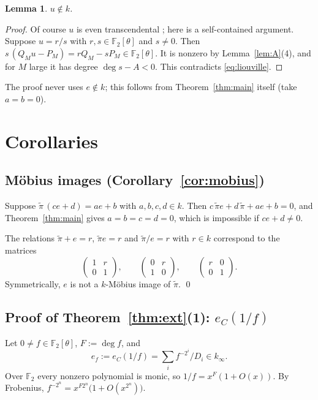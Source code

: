 \documentclass[11pt]{amsart}
\newtheorem{lemma}[theorem]{Lemma}
\theoremstyle{remark}
\numberwithin{equation}{section}
\newcommand{\F}{\mathbb{F}}
\newcommand{\kinf}{k_\infty}
\newcommand{\pit}{\tilde\pi}
\newcommand{\eC}{e_C}
\begin{document}
\begin{lemma}\label{lem:uirr}
$u\notin k$.
\end{lemma}

\begin{proof}
Of course $u$ is even transcendental \cite{Wad41}; here is a self-contained argument. Suppose $u=r/s$ with $r,s\in\F_2[\theta]$ and $s\ne0$. Then $s\,(Q_Mu-P_M)=rQ_M-sP_M\in\F_2[\theta]$. It is nonzero by Lemma~\ref{lem:A}(4), and for $M$ large it has degree $\deg s-A<0$. This contradicts \eqref{eq:liouville}.
\end{proof}

The proof never uses $e\notin k$; this follows from Theorem~\ref{thm:main} itself (take $a=b=0$).

\section{Corollaries}\label{sec:cor}

\subsection{M\"obius images (\texorpdfstring{Corollary~\ref{cor:mobius}}{Corollary 1.2})}
Suppose $\pit\,(ce+d)=ae+b$ with $a,b,c,d\in k$. Then $c\,\pit e+d\,\pit+ae+b=0$, and Theorem~\ref{thm:main} gives $a=b=c=d=0$, which is impossible if $ce+d\ne0$.

The relations $\pit+e=r$, $\pit e=r$ and $\pit/e=r$ with $r\in k$ correspond to the matrices
\[
\begin{pmatrix}1&r\\0&1\end{pmatrix},\qquad\begin{pmatrix}0&r\\1&0\end{pmatrix},\qquad\begin{pmatrix}r&0\\0&1\end{pmatrix}.
\]
Symmetrically, $e$ is not a $k$-M\"obius image of $\pit$. \qed

\subsection{\texorpdfstring{Proof of Theorem~\ref{thm:ext}(1): $\eC(1/f)$}{Proof of Theorem 1.3(1)}}
Let $0\ne f\in\F_2[\theta]$, $F:=\deg f$, and
\[
e_f:=\eC(1/f)=\sum_i f^{-2^i}/D_i\in\kinf .
\]
Over $\F_2$ every nonzero polynomial is monic, so $1/f=x^F(1+O(x))$. By Frobenius, $f^{-2^n}=x^{F2^n}\bigl(1+O(x^{2^n})\bigr)$.
\end{document}
